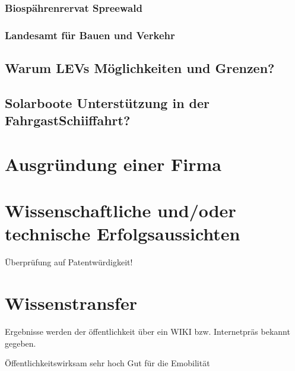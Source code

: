 \subsubsection{Biospährenrervat Spreewald}

\subsubsection{Landesamt für Bauen und Verkehr }


\subsection{Warum LEVs Möglichkeiten und Grenzen?}
\label{sec:WarumLEVsMöglichkeitenUndGrenzen}


\subsection{Solarboote Unterstützung in der FahrgastSchiiffahrt?}
\label{sec:SolarbooteUnterstützungInDerFahrgastSchiiffahrt}

\section{Ausgründung einer Firma}
\label{sec:AusgründungEinerFirma}




\section{Wissenschaftliche und/oder technische Erfolgsaussichten}
\label{sec:WissenschaftlicheUndOderTechnischeErfolgsaussichten}

Überprüfung auf Patentwürdigkeit!

\section{Wissenstransfer}
\label{sec:Wissenstransfer}

Ergebnisse werden der öffentlichkeit über ein WIKI bzw. Internetpräs bekannt gegeben.

Öffentlichkeitswirksam sehr hoch
Gut für die Emobilität

